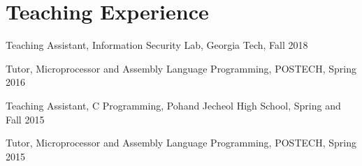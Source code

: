 \section*{Teaching Experience}
\begin{description}

\item Teaching Assistant, Information Security Lab, Georgia Tech, Fall 2018
\item Tutor, Microprocessor and Assembly Language Programming, POSTECH, Spring 2016
\item Teaching Assistant, C Programming, Pohand Jecheol High School, Spring and Fall 2015
\item Tutor, Microprocessor and Assembly Language Programming, POSTECH, Spring 2015

\end{description}
